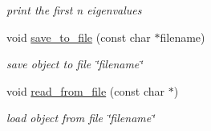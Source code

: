 \begin{DoxyCompactItemize}
\begin{DoxyCompactList}\small\item\em print the first n eigenvalues \end{DoxyCompactList}\item 
void \hyperlink{classlhamil_a33bd144e6229561d16d5c6fa8ab88a1e}{save\+\_\+to\+\_\+file} (const char $\ast$filename)\hypertarget{classlhamil_a33bd144e6229561d16d5c6fa8ab88a1e}{}\label{classlhamil_a33bd144e6229561d16d5c6fa8ab88a1e}

\begin{DoxyCompactList}\small\item\em save object to file \char`\"{}filename\char`\"{} \end{DoxyCompactList}\item 
void \hyperlink{classlhamil_a0486bea26b7fc3c7544f75f3b70caa3e}{read\+\_\+from\+\_\+file} (const char $\ast$)\hypertarget{classlhamil_a0486bea26b7fc3c7544f75f3b70caa3e}{}\label{classlhamil_a0486bea26b7fc3c7544f75f3b70caa3e}

\begin{DoxyCompactList}\small\item\em load object from file \char`\"{}filename\char`\"{} \end{DoxyCompactList}\end{DoxyCompactItemize}
